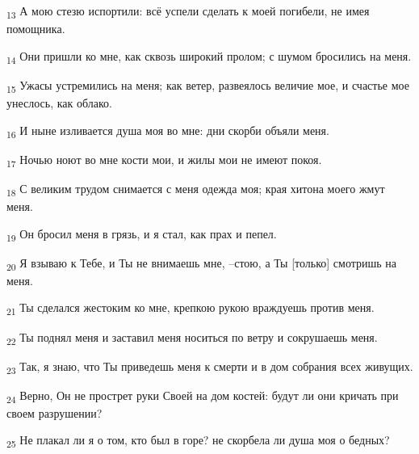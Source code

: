 \begin{tcolorbox}
\textsubscript{13} А мою стезю испортили: всё успели сделать к моей погибели, не имея помощника.
\end{tcolorbox}
\begin{tcolorbox}
\textsubscript{14} Они пришли ко мне, как сквозь широкий пролом; с шумом бросились на меня.
\end{tcolorbox}
\begin{tcolorbox}
\textsubscript{15} Ужасы устремились на меня; как ветер, развеялось величие мое, и счастье мое унеслось, как облако.
\end{tcolorbox}
\begin{tcolorbox}
\textsubscript{16} И ныне изливается душа моя во мне: дни скорби объяли меня.
\end{tcolorbox}
\begin{tcolorbox}
\textsubscript{17} Ночью ноют во мне кости мои, и жилы мои не имеют покоя.
\end{tcolorbox}
\begin{tcolorbox}
\textsubscript{18} С великим трудом снимается с меня одежда моя; края хитона моего жмут меня.
\end{tcolorbox}
\begin{tcolorbox}
\textsubscript{19} Он бросил меня в грязь, и я стал, как прах и пепел.
\end{tcolorbox}
\begin{tcolorbox}
\textsubscript{20} Я взываю к Тебе, и Ты не внимаешь мне, --стою, а Ты [только] смотришь на меня.
\end{tcolorbox}
\begin{tcolorbox}
\textsubscript{21} Ты сделался жестоким ко мне, крепкою рукою враждуешь против меня.
\end{tcolorbox}
\begin{tcolorbox}
\textsubscript{22} Ты поднял меня и заставил меня носиться по ветру и сокрушаешь меня.
\end{tcolorbox}
\begin{tcolorbox}
\textsubscript{23} Так, я знаю, что Ты приведешь меня к смерти и в дом собрания всех живущих.
\end{tcolorbox}
\begin{tcolorbox}
\textsubscript{24} Верно, Он не прострет руки Своей на дом костей: будут ли они кричать при своем разрушении?
\end{tcolorbox}
\begin{tcolorbox}
\textsubscript{25} Не плакал ли я о том, кто был в горе? не скорбела ли душа моя о бедных?
\end{tcolorbox}
